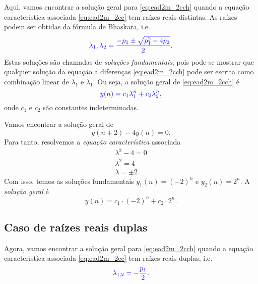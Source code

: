 Aqui, vamos encontrar a solução geral para \eqref{eq:ead2m_2cch} quando a equação característica associada \eqref{eq:ead2m_2ec} tem raízes reais distintas. As raízes podem ser obtidas da fórmula de Bhaskara, i.e.
\begin{equation}
  {\color{blue}\lambda_1,\lambda_2 = \frac{-p_1 \pm \sqrt{p_1^2-4p_2}}{2}}.
\end{equation}
Estas soluções são chamadas de \emph{soluções fundamentais}, pois pode-se mostrar que qualquer solução da equação a diferenças \eqref{eq:ead2m_2cch} pode ser escrita como combinação linear de $\lambda_1$ e $\lambda_1$. Ou seja, a solução geral de \eqref{eq:ead2m_2cch} é
\begin{equation}
  {\color{blue}y(n) = c_1\lambda_1^n + c_2\lambda_2^n},
\end{equation}
onde $c_1$ e $c_2$ são constantes indeterminadas.

\begin{ex}
  Vamos encontrar a solução geral de
  \begin{equation}
    y(n+2) - 4y(n) = 0.
  \end{equation}
  Para tanto, resolvemos a \emph{equação característica} associada
  \begin{gather}
    \lambda^2 - 4 = 0\\
    \lambda^2 = 4\\
    \lambda = \pm 2
  \end{gather}
  Com isso, temos as soluções fundamentais $y_1(n)=(-2)^n$ e $y_2(n)=2^n$. A \emph{solução geral} é
  \begin{equation}
    y(n) = c_1\cdot (-2)^n + c_2\cdot 2^n.
  \end{equation}
\end{ex}

\subsection{Caso de raízes reais duplas}

Agora, vamos encontrar a solução geral para \eqref{eq:ead2m_2cch} quando a equação característica associada \eqref{eq:ead2m_2ec} tem raízes reais duplas, i.e.
\begin{equation}
  {\color{blue}\lambda_{1,2} = -\frac{p_1}{2}}.
\end{equation}

